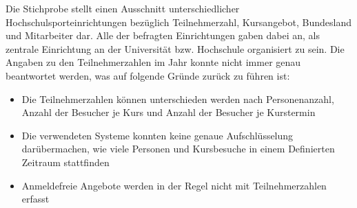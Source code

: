 \begin{table}[h]
\centering
{}
\caption{Übersicht befragter Hochschulen}
\label{BefragungHochschulen}
\end{table}

Die Stichprobe stellt einen Ausschnitt unterschiedlicher Hochschulsporteinrichtungen bezüglich Teilnehmerzahl, Kursangebot, Bundesland und Mitarbeiter dar. Alle der befragten Einrichtungen gaben dabei an, als zentrale Einrichtung an der Universität bzw. Hochschule organisiert zu sein. Die Angaben zu den Teilnehmerzahlen im Jahr konnte nicht immer genau beantwortet werden, was auf folgende Gründe zurück zu führen ist:
\begin{itemize}
\item Die Teilnehmerzahlen können unterschieden werden nach Personenanzahl, Anzahl der Besucher je Kurs und Anzahl der Besucher je Kurstermin
\item Die verwendeten Systeme konnten keine genaue Aufschlüsselung darübermachen, wie viele Personen und Kursbesuche in einem Definierten Zeitraum stattfinden
\item Anmeldefreie Angebote werden in der Regel nicht mit Teilnehmerzahlen erfasst
\end{itemize}

